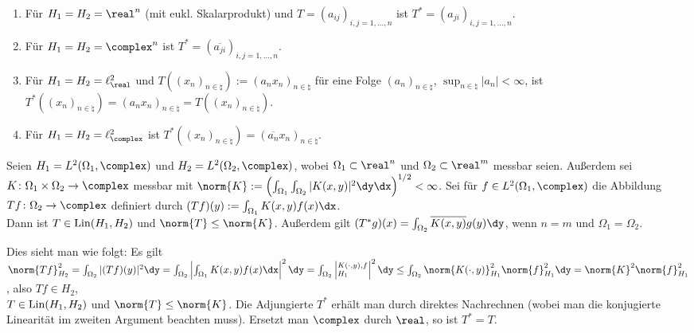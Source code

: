 \begin{Bsp}
    \begin{enumerate}[label=\emph{(\alph*)}]
        \item
        Für $H_1 = H_2 = \real^n$ (mit eukl. Skalarprodukt) und
        $T = (a_{ij})_{i,j=1,\dotsc,n}$ ist $T^\ast = (a_{ji})_{i,j=1,\dotsc,n}$.

        \item
        Für $H_1 = H_2 = \complex^n$ ist $T^\ast = (\overline{a_{ji}})_{i,j=1,\dotsc,n}$.

        \item
        Für $H_1 = H_2 = \ell^2_\real$ und
        $T((x_n)_{n \in \natural}) := (a_n x_n)_{n \in \natural}$ für eine Folge
        $(a_n)_{n \in \natural}$, $\sup_{n \in \natural} |a_n| < \infty$, ist
        $T^\ast((x_n)_{n \in \natural}) = (a_n x_n)_{n \in \natural} = T((x_n)_{n \in \natural})$.

        \item
        Für $H_1 = H_2 = \ell^2_\complex$ ist
        $T^\ast((x_n)_{n \in \natural}) = (\overline{a_n} x_n)_{n \in \natural}$.
    \end{enumerate}
\end{Bsp}

\linie

\begin{Bsp}
    Seien $H_1 = L^2(\Omega_1, \complex)$ und $H_2 = L^2(\Omega_2, \complex)$,
    wobei $\Omega_1 \subset \real^n$ und $\Omega_2 \subset \real^m$ messbar seien.
    Außerdem sei $K\colon \Omega_1 \times \Omega_2 \rightarrow \complex$ messbar
    mit $\norm{K} := \left(\int_{\Omega_1} \int_{\Omega_2}
    |K(x, y)|^2 \dy \dx\right)^{1/2} < \infty$.
    Sei für $f \in L^2(\Omega_1, \complex)$ die Abbildung $Tf\colon \Omega_2 \rightarrow \complex$
    definiert durch $(Tf)(y) := \int_{\Omega_1} K(x, y)f(x)\dx$.\\
    Dann ist $T \in \operatorname{Lin}(H_1, H_2)$ und $\norm{T} \le \norm{K}$.
    Außerdem gilt $(T^\ast g)(x) = \int_{\Omega_2} \overline{K(x, y)} g(y) \dy$,
    wenn $n = m$ und $\Omega_1 = \Omega_2$.

    Dies sieht man wie folgt:
    Es gilt $\norm{Tf}_{H_2}^2 = \int_{\Omega_2} |(Tf)(y)|^2 \dy
    = \int_{\Omega_2} \left|\int_{\Omega_1} K(x, y)f(x)\dx\right|^2 \dy\\
    = \int_{\Omega_2} \left|\sp{K(\cdot, y), f}_{H_1}\right|^2 \dy
    \le \int_{\Omega_2} \norm{K(\cdot, y)}_{H_1}^2 \norm{f}_{H_1}^2 \dy
    = \norm{K}^2 \norm{f}_{H_1}^2$,
    also $Tf \in H_2$,\\
    $T \in \operatorname{Lin}(H_1, H_2)$ und $\norm{T} \le \norm{K}$.
    Die Adjungierte $T^\ast$ erhält man durch direktes Nachrechnen
    (wobei man die konjugierte Linearität im zweiten Argument beachten muss).
    Ersetzt man $\complex$ durch $\real$, so ist $T^\ast = T$.
\end{Bsp}

